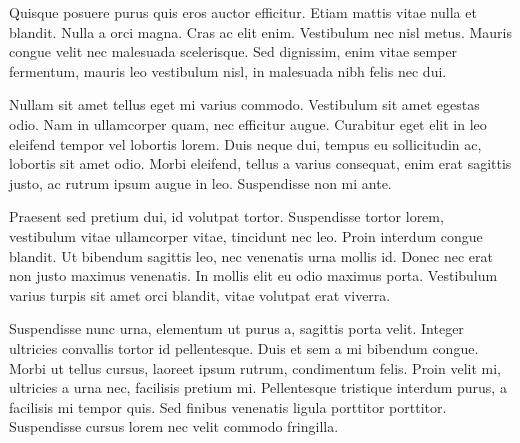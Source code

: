 Quisque posuere purus quis eros auctor efficitur. Etiam mattis vitae nulla et blandit. Nulla a orci magna. Cras ac elit enim. Vestibulum nec nisl metus. Mauris congue velit nec malesuada scelerisque. Sed dignissim, enim vitae semper fermentum, mauris leo vestibulum nisl, in malesuada nibh felis nec dui.

Nullam sit amet tellus eget mi varius commodo. Vestibulum sit amet egestas odio. Nam in ullamcorper quam, nec efficitur augue. Curabitur eget elit in leo eleifend tempor vel lobortis lorem. Duis neque dui, tempus eu sollicitudin ac, lobortis sit amet odio. Morbi eleifend, tellus a varius consequat, enim erat sagittis justo, ac rutrum ipsum augue in leo. Suspendisse non mi ante.

Praesent sed pretium dui, id volutpat tortor. Suspendisse tortor lorem, vestibulum vitae ullamcorper vitae, tincidunt nec leo. Proin interdum congue blandit. Ut bibendum sagittis leo, nec venenatis urna mollis id. Donec nec erat non justo maximus venenatis. In mollis elit eu odio maximus porta. Vestibulum varius turpis sit amet orci blandit, vitae volutpat erat viverra.

Suspendisse nunc urna, elementum ut purus a, sagittis porta velit. Integer ultricies convallis tortor id pellentesque. Duis et sem a mi bibendum congue. Morbi ut tellus cursus, laoreet ipsum rutrum, condimentum felis. Proin velit mi, ultricies a urna nec, facilisis pretium mi. Pellentesque tristique interdum purus, a facilisis mi tempor quis. Sed finibus venenatis ligula porttitor porttitor. Suspendisse cursus lorem nec velit commodo fringilla.